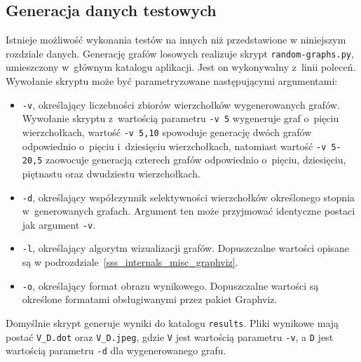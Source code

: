 \subsection*{Generacja danych testowych}
\par{
  Istnieje możliwość wykonania testów na innych niż przedstawione w niniejszym rozdziale danych.
  Generację grafów losowych realizuje skrypt \texttt{random-graphs.py}, umieszczony w~głównym katalogu aplikacji.
  Jest on wykonywalny z~linii poleceń.
  Wywołanie skryptu może być parametryzowane następującymi argumentami:
  \begin{itemize}
    \item \texttt{-v}, określający liczebności zbiorów wierzchołków wygenerowanych grafów.
      Wywołanie skryptu z~wartością parametru \texttt{-v 5} wygeneruje graf o~pięciu wierzchołkach, wartość \texttt{-v 5,10} spowoduje generację dwóch grafów odpowiednio o~pięciu i~dziesięciu wierzchołkach, natomiast wartość \texttt{-v 5-20,5} zaowocuje generacją czterech grafów odpowiednio o~pięciu, dziesięciu, piętnastu oraz dwudziestu wierzchołkach.
    \item \texttt{-d}, określający współczynnik selektywności wierzchołków określonego stopnia w~generowanych grafach.
      Argument ten może przyjmować identyczne postaci jak argument \texttt{-v}.
    \item \texttt{-l}, określający algorytm wizualizacji grafów. Dopuszczalne wartości opisane są w podrozdziale~\ref{sss_internals_misc_graphviz}.
    \item \texttt{-o}, określający format obrazu wynikowego. Dopuszczalne wartości są określone formatami obsługiwanymi przez pakiet Graphviz.
  \end{itemize}

  Domyślnie skrypt generuje wyniki do katalogu \texttt{results}.
  Pliki wynikowe mają postać \texttt{V\_D.dot} oraz \texttt{V\_D.jpeg}, gdzie \texttt{V} jest wartością parametru \texttt{-v}, a  \texttt{D} jest wartością parametru \texttt{-d} dla wygenerowanego grafu.
}
